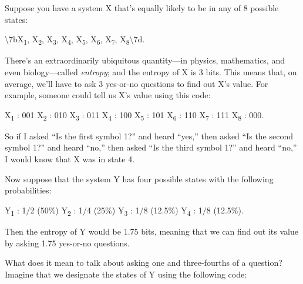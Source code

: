 {
 Suppose you have a system X that's equally likely
to be in any of 8 possible states:}

{\centering
 {\textbackslash}{\textquotesingle}7bX\textsubscript{1},
X\textsubscript{2}, X\textsubscript{3}, X\textsubscript{4},
X\textsubscript{5}, X\textsubscript{6}, X\textsubscript{7},
X\textsubscript{8}{\textbackslash}{\textquotesingle}7d.
\par}


\bigskip

{
 There's an extraordinarily ubiquitous
quantity---in physics, mathematics, and even biology---called
\textit{entropy}; and the entropy of X is 3 bits. This means that, on
average, we'll have to ask 3 yes-or-no questions to
find out X's value. For example, someone could tell us
X's value using this code:}

{\centering
 X\textsubscript{1} : 001\newline
 X\textsubscript{2} : 010\newline
 X\textsubscript{3} : 011\newline
 X\textsubscript{4} : 100\newline
 X\textsubscript{5} : 101\newline
 X\textsubscript{6} : 110\newline
 X\textsubscript{7} : 111\newline
 X\textsubscript{8} : 000.
\par}


\bigskip

{
 So if I asked ``Is the first symbol
1?'' and heard
``yes,'' then asked
``Is the second symbol 1?'' and
heard ``no,'' then asked
``Is the third symbol 1?'' and heard
``no,'' I would know that X was in
state 4.}

{
 Now suppose that the system Y has four possible states with the
following probabilities:}

{\centering
 Y\textsubscript{1} : 1$/$2 (50\%)\newline
 Y\textsubscript{2} : 1$/$4 (25\%)\newline
 Y\textsubscript{3} : 1$/$8 (12.5\%)\newline
 Y\textsubscript{4} : 1$/$8 (12.5\%).
\par}


\bigskip

{
 Then the entropy of Y would be 1.75 bits, meaning that we can find
out its value by asking 1.75 yes-or-no questions.}

{
 What does it mean to talk about asking one and three-fourths of a
question? Imagine that we designate the states of Y using the following
code:}

